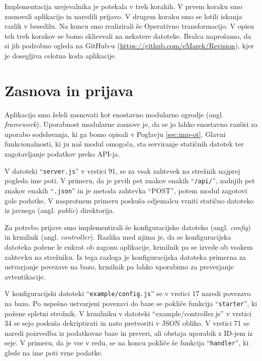\documentclass[a4paper, 12pt, twoside]{book}
\begin{document}
Implementacija urejevalnika je potekala v treh korakih. V prvem koraku smo zasnovali aplikacijo in naredili prijavo. V drugem koraku smo se lotili iskanja razlik v besedilu. Na koncu smo realizirali še Operativno transformacijo. V opisu teh treh korakov se bomo sklicevali na nekatere datoteke. Bralca naprošamo, da si jih podrobno ogleda na GitHub-u (\url{https://github.com/eMarek/Revision}), kjer je dosegljiva celotna koda aplikacije.

\section{Zasnova in prijava}

Aplikacijo smo želeli zasnovati kot enostavno modularno ogrodje (angl. \textit{framework}). Uporabnost modularne zasnove je, da se jo lahko enostavno razširi za uporabo sodelovanja, ki ga bomo opisali v Poglavju \ref{sec:imp-ot}. Glavni funkcionalnosti, ki ju naš modul omogoča, sta serviranje statičnih datotek ter zagotavljanje podatkov preko API-ja.

V datoteki “{\tt server.js}” v vrstici 91, se za vsak zahtevek na strežnik najprej pogleda ime poti. V primeru, da je prvih pet znakov enakih “{\tt /api/}”, zadnjih pet znakov enakih “{\tt .json}” in je metoda zahtevka “POST”, potem modul zagotovi gole podatke. V nasprotnem primeru poskuša odjemalcu vrniti statično datoteko iz javnega (angl. \textit{public}) direktorija.

Za potrebo prijave smo implementirali še konfiguracijsko datoteko (angl. \textit{config}) in krmilnik (angl. \textit{controller}). Razlika med njima je, da se konfiguracijska datoteka požene le enkrat ob zagonu aplikacije, krmilnik pa se izvede ob vsakem zahtevku na strežniku. Iz tega razloga je konfiguracijska datoteka primerna za ustvarjanje povezave na bazo, krmilnik pa lahko uporabimo za preverjanje avtentikacije.

V konfiguracijski datoteki “{\tt example/config.js}” se v vrstici 17 naredi povezavo na bazo. Po uspešno ustvarjeni povezavi do baze se pokliče funkcija “{\tt starter}”, ki požene spletni strežnik. V krmilniku v datoteki “{example/controller.js}” v vrstici 34 se sejo poskuša dekriptirati in nato pretvoriti v JSON obliko. V vrstici 71 se naredi poizvedba iz podatkovne baze in preveri, ali obstaja uporabik z ID-jem iz seje. V primeru, da je vse v redu, se na koncu pokliče še funkcija “{\tt handler}”, ki glede na ime poti vrne podatke.
\end{document}
